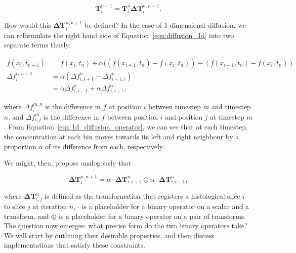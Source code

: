 		\begin{equation}
			\mathbf{T}_i^{n+1} = \mathbf{T}_i^n \mathbf{\Delta T}_i^{n,n+1}.
		\end{equation}
		
	  How would this $\mathbf{\Delta T}_i^{n,n+1}$ be defined? In the case of 1-dimensional diffusion, we can reformulate the right hand side of Equation~\ref{eqn:diffusion_1d} into two separate terms thusly:
		
	  \begin{align}
	    f(x_i, t_{n+1}) &= f(x_i, t_n) + \alpha ((f(x_{i+1}, t_n) - f(x_i, t_n)) - (f(x_{i-1}, t_n) - f(x_i, t_n)) \\
			\Delta f_i^{n,n+1} &= \alpha (\Delta f_{i,i+1}^n - \Delta f_{i-1,i}^n) \\
			                   &= \alpha \Delta f_{i,i-1}^n + \alpha \Delta f_{i,i+1}^n, \label{eqn:1d_diffusion_operator}
		\end{align}
		
    where $\Delta f_i^{m,n}$ is the difference in $f$ at position $i$ between timestep $m$ and timestep $n$, and $\Delta f_{i,j}^m$ is the difference in $f$ between position $i$ and position $j$ at timestep $m$. From Equation~\ref{eqn:1d_diffusion_operator}, we can see that at each timestep, the concentration at each bin moves towards its left and right neighbour by a proportion $\alpha$ of its difference from each, respectively.
		
	  We might, then, propose analogously that
		
		\begin{equation}
		 	\mathbf{\Delta T}_i^{n,n+1} = \alpha \cdot \mathbf{\Delta T}_{i,i+1}^n \oplus \alpha \cdot \mathbf{\Delta T}_{i,i-1}^n, \label{eqn:transformational_placeholder}
		\end{equation}
	 	
	 	where $\mathbf{\Delta T}_{i,j}^n$ is defined as the transformation that registers a histological slice $i$ to slice $j$ at iteration $n$, $\cdot$ is a placeholder for a binary operator on a scalar and a transform, and $\oplus$ is a placeholder for a binary operator on a pair of transforms. The question now emerges: what precise form do the two binary operators take? We will start by outlining their desirable properties, and then discuss implementations that satisfy these constraints.
		
